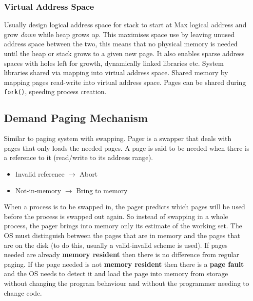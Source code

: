 \documentclass{article}%
\begin{document}
\subsubsection{Virtual Address Space}
\label{sec:orgbc62ddf}
Usually design logical address space for stack to start at Max logical address and grow \emph{down} while heap grows \emph{up}.
This maximises space use by leaving unused address space between the two, this means that no physical memory is needed until the heap or stack grows to a given new page.
It also enables sparse address spaces with holes left for growth, dynamically linked libraries etc.
System libraries shared via mapping into virtual address space.
Shared memory by mapping pages read-write into virtual address space.
Pages can be shared during \texttt{fork()}, speeding process creation.
\subsection{Demand Paging Mechanism}
\label{sec:org9041607}
Similar to paging system with swapping.
Pager is a swapper that deals with pages that only loads the needed pages.
A page is said to be needed when there is a reference to it (read/write to its address range).
\begin{itemize}
\item Invalid reference \(\rightarrow\) Abort
\item Not-in-memory \(\rightarrow\) Bring to memory
\end{itemize}
When a process is to be swapped in, the pager predicts which pages will be used before the process is swapped out again.
So instead of swapping in a whole process, the pager brings into memory only its estimate of the working set.
The OS must distinguish between the pages that are in memory and the pages that are on the disk (to do this, usually a valid-invalid scheme is used).
If pages needed are already \textbf{memory resident} then there is no difference from regular paging.
If the page needed is not \textbf{memory resident} then there is a \textbf{page fault} and the OS needs to detect it and load the page into memory from storage without changing the program behaviour and without the programmer needing to change code.
\end{document}
